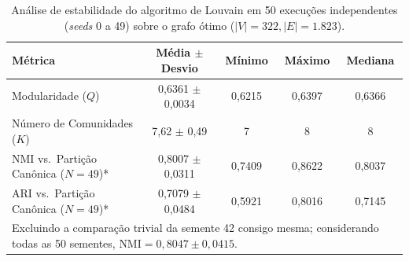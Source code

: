\begin{table}[htb]
\centering
\caption{Análise de estabilidade do algoritmo de Louvain em 50 execuções independentes (\textit{seeds} 0 a 49) sobre o grafo ótimo ($|V|=322, |E|=1.823$).}
\label{tab:estabilidade}
\footnotesize
\begin{tabular}{lcccc}
\toprule
\textbf{Métrica} & \textbf{Média $\pm$ Desvio} & \textbf{Mínimo} & \textbf{Máximo} & \textbf{Mediana} \\
\midrule
Modularidade ($Q$) & 0,6361 $\pm$ 0,0034 & 0,6215 & 0,6397 & 0,6366 \\
Número de Comunidades ($K$) & 7,62 $\pm$ 0,49 & 7 & 8 & 8 \\
NMI vs.\ Partição Canônica ($N=49$)* & 0,8007 $\pm$ 0,0311 & 0,7409 & 0,8622 & 0,8037 \\
ARI vs.\ Partição Canônica ($N=49$)* & 0,7079 $\pm$ 0,0484 & 0,5921 & 0,8016 & 0,7145 \\
\bottomrule
\multicolumn{5}{l}{\scriptsize *Excluindo a comparação trivial da semente 42 consigo mesma; considerando todas as 50 sementes, $\text{NMI} = 0,8047 \pm 0,0415$.}
\end{tabular}
\end{table}
